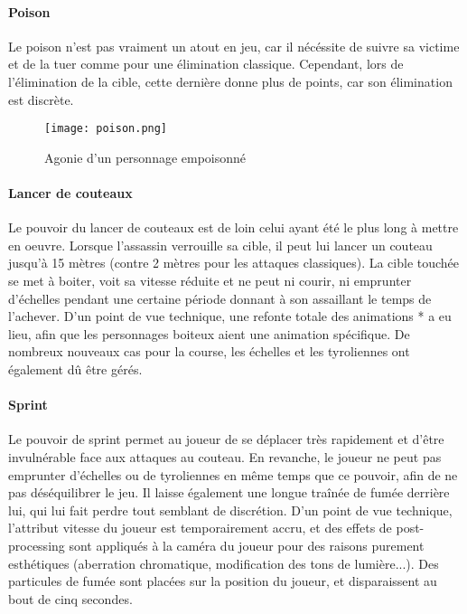 		\paragraph{Poison}

			Le poison n'est pas vraiment un atout en jeu, car il nécéssite de suivre sa victime et de la tuer comme pour une 
			élimination classique. Cependant, lors de l'élimination de la cible, cette dernière donne plus de points, car son 
			élimination est discrète.
			
			\begin{figure}[hbt!]
				\centering
				\texttt{[image: poison.png]}
				\caption{Agonie d'un personnage empoisonné}
			\end{figure}
			\FloatBarrier

		
		\paragraph{Lancer de couteaux}

			Le pouvoir du lancer de couteaux est de loin celui ayant été le plus long à mettre en oeuvre. Lorsque l'assassin 
			verrouille sa cible, il peut lui lancer un couteau jusqu'à 15 mètres (contre 2 mètres pour les attaques classiques).
			La cible touchée se met à boiter, voit sa vitesse réduite et ne peut ni courir, ni emprunter d'échelles pendant une certaine 
			période donnant à son assaillant le temps de l'achever. D'un point de vue technique, une refonte totale des animations *
			a eu lieu, afin que les personnages boiteux aient une animation spécifique. De nombreux nouveaux cas pour la course, les 
			échelles et les tyroliennes ont également dû être gérés. 


		\paragraph{Sprint}
	
			Le pouvoir de sprint permet au joueur de se déplacer très rapidement et d'être invulnérable face aux attaques 
			au couteau. En revanche, le joueur ne peut pas emprunter d'échelles ou de tyroliennes en même temps que ce pouvoir, afin 
			de ne pas déséquilibrer le jeu. Il laisse également une longue traînée de fumée derrière lui, qui lui fait perdre 
			tout semblant de discrétion. D'un point de vue technique, l'attribut vitesse du joueur est temporairement accru, 
			et des effets de post-processing sont appliqués à la caméra du joueur pour des raisons purement esthétiques (aberration 
			chromatique, modification des tons de lumière...). Des particules de fumée sont placées sur la position du joueur, et 
			disparaissent au bout de cinq secondes.

